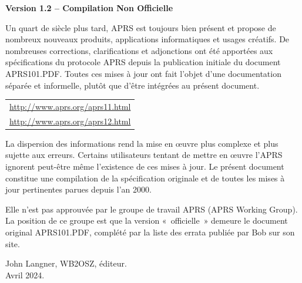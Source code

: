 \thispagestyle{empty}

\begingroup
\setlength{\parskip}{0pt}
\setlength{\parindent}{0pt}
\small
\vspace*{1.0em}
\noindent
{\sffamily\large\bfseries Version 1.2 -- Compilation Non Officielle\par}
\vspace{1.2em}

\noindent
Un quart de siècle plus tard, APRS est toujours bien présent et propose de
nombreux nouveaux produits, applications informatiques et usages créatifs. De
nombreuses corrections, clarifications et adjonctions ont été apportées aux
spécifications du protocole APRS depuis la publication initiale du document
APRS101.PDF. Toutes ces mises à jour ont fait l'objet d'une documentation
séparée et informelle, plutôt que d'être intégrées au présent document.

\vspace{1em}
\noindent
\begin{tabular}{@{}l@{}}
\url{http://www.aprs.org/aprs11.html}\\
\url{http://www.aprs.org/aprs12.html}
\end{tabular}

\vspace{1em}
\noindent
La dispersion des informations rend la mise en œuvre plus complexe et plus
sujette aux erreurs. Certains utilisateurs tentant de mettre en œuvre l'APRS
ignorent peut-être même l'existence de ces mises à jour. Le présent document
constitue une compilation de la spécification originale et de toutes les mises
à jour pertinentes parues depuis l'an 2000.

\vspace{1em}
\noindent
Elle n'est pas approuvée par le groupe de travail APRS (APRS Working Group).
La position de ce groupe est que la version «~officielle~» demeure le
document original APRS101.PDF, complété par la liste des errata publiée par
Bob sur son site.

\vspace{1em}
\noindent
John Langner, WB2OSZ, éditeur.\\
Avril 2024.

